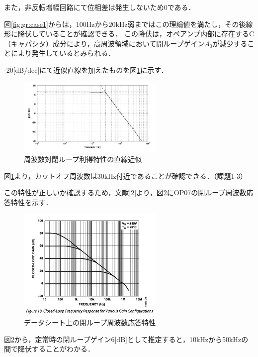 \documentclass[dvipdfmx,titlepage,a4j]{jsarticle}  %
\begin{document}
また，非反転増幅回路にて位相差は発生しないため0である．

図\ref{fig:gr:case1}からは，$100$Hzから$20$kHz弱まではこの理論値を満たし，その後線形に降伏していることが確認できる．
この降伏は，オペアンプ内部に存在するC（キャパシタ）成分により，高周波領域において開ループゲイン$A_0$が減少することにより発生しているとみられる．

-20[dB/dec]にて近似直線を加えたものを図\ref{fig:case1kinji}に示す．
\begin{figure}[H]
  \begin{center}
      \includegraphics[width=7cm]{../image/case1kinji.png}
      \caption{周波数対閉ループ利得特性の直線近似}
      \label{fig:case1kinji}
  \end{center}
\end{figure}

図\ref{fig:case1kinji}より，カットオフ周波数は30kHz付近であることが確認できる．（課題1-3）

この特性が正しいか確認するため，文献[2]より，図\ref{fig:16}にOP07の閉ループ周波数応答特性を示す．
\begin{figure}[H]
  \begin{center}
      \includegraphics[width=7cm]{../image/fig16.png}
      \caption{データシート上の閉ループ周波数応答特性}
      \label{fig:16}
  \end{center}
\end{figure}
図\ref{fig:16}から，定常時の閉ループゲイン6[dB]として推定すると，10kHzから50kHzの間で降伏することがわかる．
\end{document}
